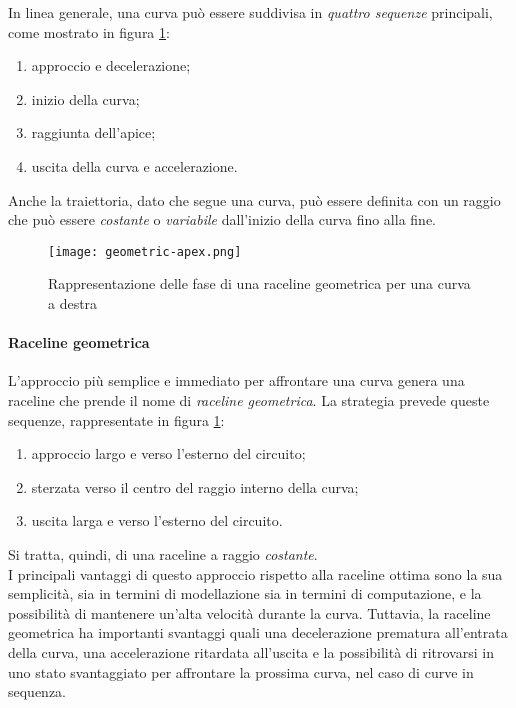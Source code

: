 In linea generale, una curva può essere suddivisa in \textit{quattro sequenze} principali, come mostrato
in figura \ref{fig:geom-raceline}:
\begin{enumerate}
	\item approccio e decelerazione;
	\item inizio della curva;
	\item raggiunta dell'apice;
	\item uscita della curva e accelerazione.
\end{enumerate}
Anche la traiettoria, dato che segue una curva, può essere definita con un raggio che può essere
\textit{costante} o \textit{variabile} dall'inizio della curva fino alla fine.

\begin{figure}[H]
	\begin{center}
		\texttt{[image: geometric-apex.png]}
	\end{center}
	\caption{Rappresentazione delle fase di una raceline geometrica per una curva a destra \cite{drivingfast}}
	\label{fig:geom-raceline}
\end{figure}

\paragraph{Raceline geometrica}
L'approccio più semplice e immediato per affrontare una curva genera una raceline che prende il
nome di \textit{raceline geometrica}. La strategia prevede queste sequenze, rappresentate in figura
\ref{fig:geom-raceline}:
\begin{enumerate}
	\item approccio largo e verso l'esterno del circuito;
	\item sterzata verso il centro del raggio interno della curva;
	\item uscita larga e verso l'esterno del circuito.
\end{enumerate}
Si tratta, quindi, di una raceline a raggio \textit{costante}.\\
I principali vantaggi di questo approccio rispetto alla raceline ottima sono la sua semplicità, sia in
termini di modellazione sia in termini di computazione, e la possibilità di mantenere un'alta velocità
durante la curva. Tuttavia, la raceline geometrica ha importanti svantaggi quali una decelerazione
prematura all'entrata della curva, una accelerazione ritardata all'uscita e la possibilità di ritrovarsi
in uno stato svantaggiato per affrontare la prossima curva, nel caso di curve in sequenza.

